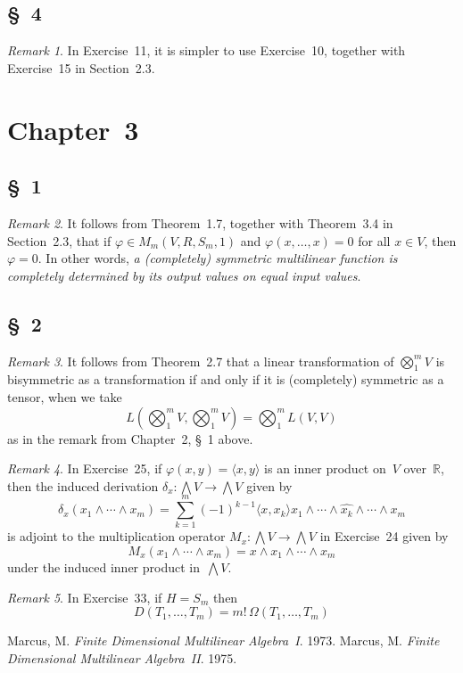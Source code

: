 \documentclass[letterpaper,12pt]{article}
\newcommand{\R}{\mathbb{R}}
\newcommand{\bigtprod}{\bigotimes}
\newcommand{\medtprod}{{\textstyle\bigtprod}}
\newcommand{\eprod}{\wedge}
\newcommand{\bigeprod}{\bigwedge}
\newcommand{\medeprod}{{\textstyle\bigeprod}}
\newcommand{\delete}{\widehat}
\newcommand{\sprod}[2]{\langle#1,#2\rangle}
\newcommand{\multi}[4]{#2_{#3}#1\cdots#1#2_{#4}}
\newcommand{\eprods}[3]{\multi{\eprod}{#1}{#2}{#3}}
\theoremstyle{definition}
\theoremstyle{remark}
\newtheorem*{rmk}{Remark}
\begin{document}
\subsection*{\S~4}
\begin{rmk}
In Exercise~11, it is simpler to use Exercise~10, together with Exercise~15 in Section~2.3.
\end{rmk}

\newpage
\section*{Chapter~3}
\subsection*{\S~1}
\begin{rmk}
It follows from Theorem~1.7, together with Theorem~3.4 in Section~2.3, that if \(\varphi\in M_m(V,R,S_m,1)\) and \(\varphi(x,\ldots,x)=0\) for all \(x\in V\), then \(\varphi=0\). In other words, \emph{a (completely) symmetric multilinear function is completely determined by its output values on equal input values}.
\end{rmk}

\subsection*{\S~2}
\begin{rmk}
It follows from Theorem~2.7 that a linear transformation of \(\medtprod_1^m V\) is bisymmetric as a transformation if and only if it is (completely) symmetric as a tensor, when we take
\[L(\medtprod_1^m V,\medtprod_1^m V)=\medtprod_1^m L(V,V)\]
as in the remark from Chapter~2, \S~1 above.
\end{rmk}

\begin{rmk}
In Exercise~25, if \(\varphi(x,y)=\sprod{x}{y}\) is an inner product on~\(V\) over~\(\R\), then the induced derivation \(\delta_x:\medeprod V\to\medeprod V\) given by
\[\delta_x(\eprods{x}{1}{m})=\sum_{k=1}^m(-1)^{k-1}\sprod{x}{x_k}x_1\eprod\cdots\eprod\delete{x_k}\eprod\cdots\eprod x_m\]
is adjoint to the multiplication operator \(M_x:\medeprod V\to\medeprod V\) in Exercise~24 given by
\[M_x(\eprods{x}{1}{m})=x\eprod\eprods{x}{1}{m}\]
under the induced inner product in~\(\medeprod V\).
\end{rmk}

\begin{rmk}
In Exercise~33, if \(H=S_m\) then
\[D(T_1,\ldots,T_m)=m!\,\Omega(T_1,\ldots,T_m)\]
\end{rmk}

\newpage
\begin{thebibliography}{0}
 Marcus, M. \textit{Finite Dimensional Multilinear Algebra~I}. 1973.
 Marcus, M. \textit{Finite Dimensional Multilinear Algebra~II}. 1975.
\end{thebibliography}
\end{document}
